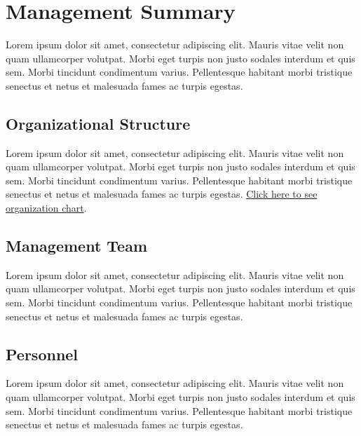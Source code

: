 \documentclass[11pt,a4paper,titlepage]{article}
\begin{document}
\section{Management Summary}
Lorem ipsum dolor sit amet, consectetur adipiscing elit. Mauris vitae velit 
non quam ullamcorper volutpat. Morbi eget turpis non justo sodales interdum 
et quis sem. Morbi tincidunt condimentum varius. Pellentesque habitant morbi 
tristique senectus et netus et malesuada fames ac turpis egestas.\newline

\subsection{Organizational Structure}
Lorem ipsum dolor sit amet, consectetur adipiscing elit. Mauris vitae velit 
non quam ullamcorper volutpat. Morbi eget turpis non justo sodales interdum 
et quis sem. Morbi tincidunt condimentum varius. Pellentesque habitant morbi 
tristique senectus et netus et malesuada fames ac turpis egestas.\newline
\hyperlink{ref_org_chart}{Click here to see organization chart}.

\subsection{Management Team}
Lorem ipsum dolor sit amet, consectetur adipiscing elit. Mauris vitae velit 
non quam ullamcorper volutpat. Morbi eget turpis non justo sodales interdum 
et quis sem. Morbi tincidunt condimentum varius. Pellentesque habitant morbi 
tristique senectus et netus et malesuada fames ac turpis egestas.\newline

\subsection{Personnel}
Lorem ipsum dolor sit amet, consectetur adipiscing elit. Mauris vitae velit 
non quam ullamcorper volutpat. Morbi eget turpis non justo sodales interdum 
et quis sem. Morbi tincidunt condimentum varius. Pellentesque habitant morbi 
tristique senectus et netus et malesuada fames ac turpis egestas.\newline
\end{document}
